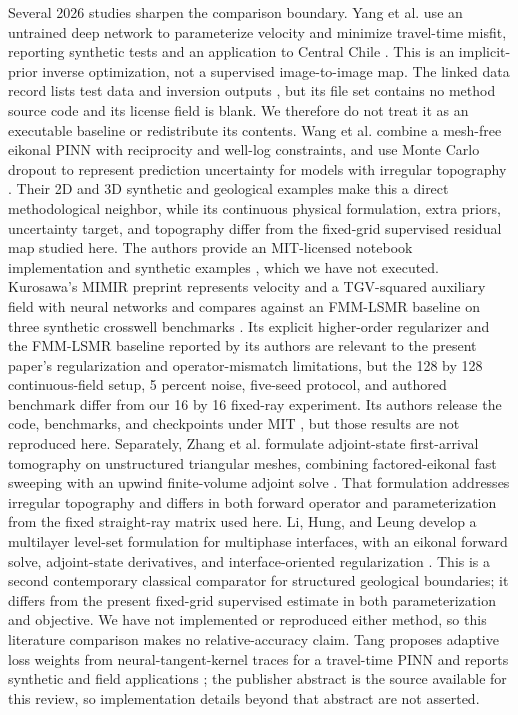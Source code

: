 \documentclass[11pt]{article}
\begin{document}
Several 2026 studies sharpen the comparison boundary. Yang et al. use an untrained deep network to parameterize velocity and minimize travel-time misfit, reporting synthetic tests and an application to Central Chile \cite{YangDNR2026}. This is an implicit-prior inverse optimization, not a supervised image-to-image map. The linked data record lists test data and inversion outputs \cite{YangDNRData2026}, but its file set contains no method source code and its license field is blank. We therefore do not treat it as an executable baseline or redistribute its contents. Wang et al. combine a mesh-free eikonal PINN with reciprocity and well-log constraints, and use Monte Carlo dropout to represent prediction uncertainty for models with irregular topography \cite{WangReciprocity2026}. Their 2D and 3D synthetic and geological examples make this a direct methodological neighbor, while its continuous physical formulation, extra priors, uncertainty target, and topography differ from the fixed-grid supervised residual map studied here. The authors provide an MIT-licensed notebook implementation and synthetic examples \cite{WangReciprocityCode2026}, which we have not executed. Kurosawa's MIMIR preprint represents velocity and a TGV-squared auxiliary field with neural networks and compares against an FMM-LSMR baseline on three synthetic crosswell benchmarks \cite{KurosawaMimir2026}. Its explicit higher-order regularizer and the FMM-LSMR baseline reported by its authors are relevant to the present paper's regularization and operator-mismatch limitations, but the 128 by 128 continuous-field setup, 5 percent noise, five-seed protocol, and authored benchmark differ from our 16 by 16 fixed-ray experiment. Its authors release the code, benchmarks, and checkpoints under MIT \cite{KurosawaMimirCode2026}, but those results are not reproduced here. Separately, Zhang et al. formulate adjoint-state first-arrival tomography on unstructured triangular meshes, combining factored-eikonal fast sweeping with an upwind finite-volume adjoint solve \cite{ZhangAdjoint2026}. That formulation addresses irregular topography and differs in both forward operator and parameterization from the fixed straight-ray matrix used here. Li, Hung, and Leung develop a multilayer level-set formulation for multiphase interfaces, with an eikonal forward solve, adjoint-state derivatives, and interface-oriented regularization \cite{LiHungLeung2026}. This is a second contemporary classical comparator for structured geological boundaries; it differs from the present fixed-grid supervised estimate in both parameterization and objective. We have not implemented or reproduced either method, so this literature comparison makes no relative-accuracy claim. Tang proposes adaptive loss weights from neural-tangent-kernel traces for a travel-time PINN and reports synthetic and field applications \cite{TangNTK2026}; the publisher abstract is the source available for this review, so implementation details beyond that abstract are not asserted.
\end{document}
